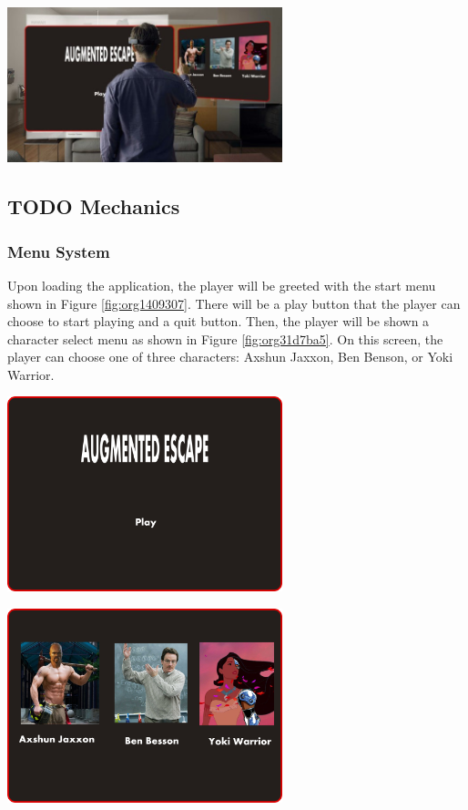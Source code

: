 \documentclass[11pt]{article}
\begin{document}
\begin{center}
\includegraphics[width=8cm]{./img/main-menu-1.jpg}
\end{center}

\subsection{{\bfseries\sffamily TODO} Mechanics}
\label{sec:orga59fea3}
\subsubsection{Menu System}
\label{sec:org4e69e23}
Upon loading the application, the player will be greeted with the start menu shown in Figure \ref{fig:org1409307}. There will be a play button that the player can choose to start playing and a quit button. Then, the player will be shown a character select menu as shown in Figure \ref{fig:org31d7ba5}. On this screen, the player can choose one of three characters: Axshun Jaxxon, Ben Benson, or Yoki Warrior.

\begin{center}
\includegraphics[width=8cm]{./img/start-screen.png}
\end{center}

\begin{center}
\includegraphics[width=8cm]{./img/character-select.png}
\end{center}
\end{document}
